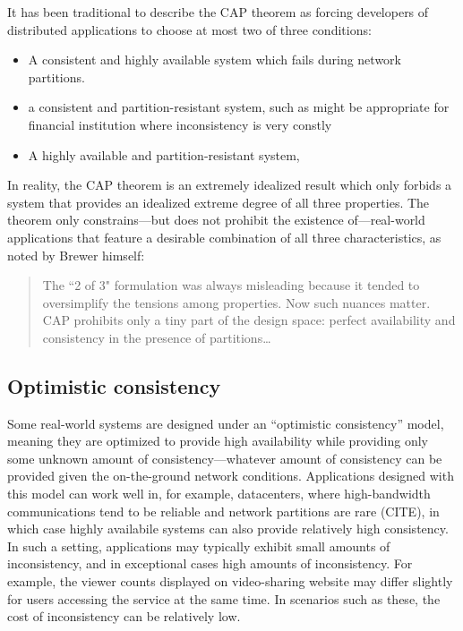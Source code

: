 It has been traditional to describe the CAP theorem as forcing
developers of distributed applications to choose at most two of three
conditions:
\begin{itemize}
  \item A consistent and highly available system which fails
    during network partitions.
  \item a consistent and partition-resistant system, such as might be
    appropriate for financial institution where inconsistency is very constly
  \item A highly available and partition-resistant system,
\end{itemize}

In reality, the CAP theorem is an extremely idealized result which
only forbids a system that provides an idealized extreme degree of all
three properties. The theorem only constrains---but does not prohibit
the existence of---real-world applications that feature a desirable
combination of all three characteristics, as noted by Brewer himself:
\begin{quote}
  The ``2 of 3" formulation was always misleading because it tended to
  oversimplify the tensions among properties. Now such nuances
  matter. CAP prohibits only a tiny part of the design space: perfect
  availability and consistency in the presence of partitions\ldots \cite{@2012brewerCAPchanged}
\end{quote}

\subsection{Optimistic consistency}
Some real-world systems are designed under an ``optimistic
consistency'' model, meaning they are optimized to provide high
availability while providing only some unknown amount of
consistency---whatever amount of consistency can be provided given the
on-the-ground network conditions. Applications designed with this
model can work well in, for example, datacenters, where high-bandwidth
communications tend to be reliable and network partitions are rare
(CITE), in which case highly availabile systems can also provide
relatively high consistency. In such a setting, applications may
typically exhibit small amounts of inconsistency, and in exceptional
cases high amounts of inconsistency. For example, the viewer counts
displayed on video-sharing website may differ slightly for users
accessing the service at the same time. In scenarios such as these,
the cost of inconsistency can be relatively low.

